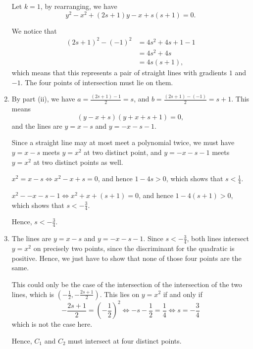 \begin{enumerate}
          Let \(k = 1\), by rearranging, we have
          \[
              y^2 - x^2 + (2s + 1) y - x + s (s + 1) = 0.
          \]

          We notice that
          \begin{align*}
              (2s + 1)^2 - (-1)^2 & = 4s^2 + 4s + 1 - 1 \\
                                  & = 4s^2 + 4s         \\
                                  & = 4 s (s + 1),
          \end{align*}
          which means that this represents a pair of straight lines with gradients \(1\) and \(-1\). The four points of intersection must lie on them.

    \item By part (ii), we have \(a = \frac{(2s + 1) - 1}{2} = s\), and \(b = \frac{(2s + 1) - (-1)}{2} = s + 1\). This means
          \[
              (y - x + s) (y + x + s + 1) = 0,
          \]
          and the lines are \(y = x - s\) and \(y = -x - s - 1\).

          Since a straight line may at most meet a polynomial twice, we must have \(y = x - s\) meets \(y = x^2\) at two distinct point, and \(y = -x - s - 1\) meets \(y = x^2\) at two distinct points as well.

          \(x^2 = x - s \iff x^2 - x + s = 0\), and hence \(1 - 4s > 0\), which shows that \(s < \frac{1}{4}\).

          \(x^2 - -x - s - 1 \iff x^2 + x + (s + 1) = 0\), and hence \(1 - 4(s + 1) > 0\), which shows that \(s < - \frac{3}{4}\).

          Hence, \(s < - \frac{3}{4}\).

    \item The lines are \(y = x - s\) and \(y = -x - s - 1\). Since \(s < - \frac{3}{4}\), both lines intersect \(y = x^2\) on precisely two points, since the discriminant for the quadratic is positive. Hence, we just have to show that none of those four points are the same.

          This could only be the case of the intersection of the intersection of the two lines, which is \(\left(-\frac{1}{2}, - \frac{2s + 1}{2}\right)\). This lies on \(y = x^2\) if and only if
          \[
              - \frac{2s + 1}{2} = \left(- \frac{1}{2}\right)^2 \iff -s - \frac{1}{2} = \frac{1}{4} \iff s =- \frac{3}{4}
          \]
          which is not the case here.

          Hence, \(C_1\) and \(C_2\) must intersect at four distinct points.
\end{enumerate}